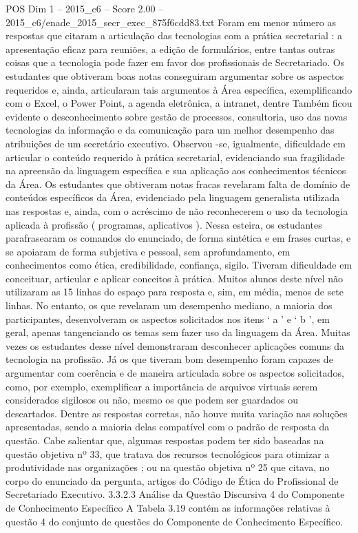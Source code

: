 \begin{textsample}{POS Dim 1 – 2015\_c6 – Score 2.00 – 2015\_c6/enade\_2015\_secr\_exec\_875f6cdd83.txt}
Foram em menor número as respostas que citaram a articulação das tecnologias com a prática secretarial : a apresentação eficaz para reuniões, a edição de formulários, entre tantas outras coisas que a tecnologia pode fazer em favor dos profissionais de Secretariado.
Os estudantes que obtiveram boas notas conseguiram argumentar sobre os aspectos requeridos e, ainda, articularam tais argumentos à Área específica, exemplificando com o Excel, o Power Point, a agenda eletrônica, a intranet, dentre Também ficou evidente o desconhecimento sobre gestão de processos, consultoria, uso das novas tecnologias da informação e da comunicação para um melhor desempenho das atribuições de um secretário executivo.
Observou -se, igualmente, dificuldade em articular o conteúdo requerido à prática secretarial, evidenciando sua fragilidade na apreensão da linguagem específica e sua aplicação aos conhecimentos técnicos da Área.
Os estudantes que obtiveram notas fracas revelaram falta de domínio de conteúdos específicos da Área, evidenciado pela linguagem generalista utilizada nas respostas e, ainda, com o acréscimo de não reconhecerem o uso da tecnologia aplicada à profissão ( programas, aplicativos ).
Nessa esteira, os estudantes parafrasearam os comandos do enunciado, de forma sintética e em frases curtas, e se apoiaram de forma subjetiva e pessoal, sem aprofundamento, em conhecimentos como ética, credibilidade, confiança, sigilo.
Tiveram dificuldade em conceituar, articular e aplicar conceitos à prática.
Muitos alunos deste nível não utilizaram as 15 linhas do espaço para resposta e, sim, em média, menos de sete linhas.
No entanto, os que revelaram um desempenho mediano, a maioria dos participantes, desenvolveram os aspectos solicitados nos itens ‘ a ’ e ‘ b ’, em geral, apenas tangenciando os temas sem fazer uso da linguagem da Área.
Muitas vezes os estudantes desse nível demonstraram desconhecer aplicações comuns da tecnologia na profissão.
Já os que tiveram bom desempenho foram capazes de argumentar com coerência e de maneira articulada sobre os aspectos solicitados, como, por exemplo, exemplificar a importância de arquivos virtuais serem considerados sigilosos ou não, mesmo os que podem ser guardados ou descartados.
Dentre as respostas corretas, não houve muita variação nas soluções apresentadas, sendo a maioria delas compatível com o padrão de resposta da questão.
Cabe salientar que, algumas respostas podem ter sido baseadas na questão objetiva nº 33, que tratava dos recursos tecnológicos para otimizar a produtividade nas organizações ; ou na questão objetiva nº 25 que citava, no corpo do enunciado da pergunta, artigos do Código de Ética do Profissional de Secretariado Executivo. 3.3.2.3 Análise da Questão Discursiva 4 do Componente de Conhecimento Específico A Tabela 3.19 contém as informações relativas à questão 4 do conjunto de questões do Componente de Conhecimento Específico.

\end{textsample}

